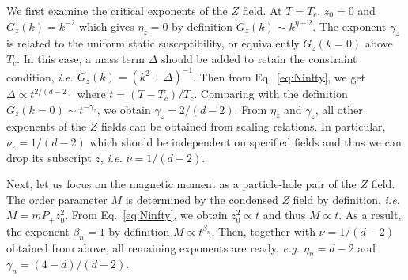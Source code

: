 \documentclass[aps,twocolumn,superscriptaddress]{revtex4-1}
\newcommand{\ie}{\textit{i.e.{ }}}
\newcommand{\eg}{\textit{e.g.{ }}}
\begin{document}
We first examine the critical exponents of the $Z$ field. At $T=T_c$, $z_0=0$ and $G_z(k)=k^{-2}$ which gives $\eta_z=0$ by definition $G_z(k)\sim k^{\eta-2}$. The exponent $\gamma_z$ is related to the uniform static susceptibility, or equivalently $G_z(k=0)$ above $T_c$. In this case, a mass term $\Delta$ should be added to retain the constraint condition, \ie $G_z(k)=(k^2+\Delta)^{-1}$. Then from Eq.~\ref{eq:Ninfty}, we get $\Delta\propto t^{2/(d-2)}$ where $t=(T-T_c)/T_c$. Comparing with the definition $G_z(k=0)\sim t^{-\gamma_z}$, we obtain $\gamma_z=2/(d-2)$. From $\eta_z$ and $\gamma_z$, all other exponents of the $Z$ fields can be obtained from scaling relations. In particular, $\nu_z=1/(d-2)$ which should be independent on specified fields and thus we can drop its subscript $z$, \ie $\nu=1/(d-2)$. 

Next, let us focus on the magnetic moment as a particle-hole pair of the $Z$ field. The order parameter $M$ is determined by the condensed $Z$ field by definition, \ie $M=mP_+z_0^2$. From Eq.~\ref{eq:Ninfty}, we obtain $z_0^2\propto t$ and thus $M\propto t$. As a result, the exponent $\beta_n=1$ by definition $M\propto t^{\beta_n}$. Then, together with $\nu=1/(d-2)$ obtained from above, all remaining exponents are ready, \eg $\eta_n=d-2$ and $\gamma_n=(4-d)/(d-2)$. 
\end{document}
